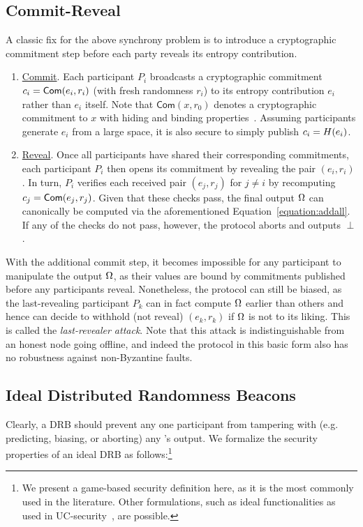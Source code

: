 \subsection{Commit-Reveal}
\label{subsection:commit-reveal}
A classic fix for the above synchrony problem is to introduce a cryptographic commitment step before each party reveals its entropy contribution.
\begin{enumerate}
\item \underline{Commit}. Each participant $P_i$ broadcasts a cryptographic commitment $c_i = \mathsf{Com}(e_i, r_i)$ (with fresh randomness $r_i$) to its entropy contribution $e_i$ rather than $e_i$ itself. Note that $\mathsf{Com}(x, r_0)$ denotes a cryptographic commitment to $x$ with hiding and binding properties~\cite{blum1983coin,damgaard1998commitment}. Assuming participants generate $e_i$ from a large space, it is also secure to simply publish $c_i = H(e_i)$.
\item \underline{Reveal}. Once all participants have shared their corresponding commitments, each participant $P_i$ then opens its commitment by revealing the pair $(e_i, r_i)$. In turn, $P_i$ verifies each received pair $(e_j, r_j)$ for $j \neq i$ by recomputing $c_j = \mathsf{Com}(e_j, r_j)$. Given that these checks pass, the final output $\Omega$ can canonically be computed via the aforementioned Equation~\ref{equation:addall}. If any of the checks do not pass, however, the protocol aborts and outputs $\perp$.
\end{enumerate}

With the additional commit step, it becomes impossible for any participant to manipulate the output $\Omega$, as their values are bound by commitments published before any participants reveal. Nonetheless, the protocol can still be biased, as the last-revealing participant $P_k$ can in fact compute $\Omega$ earlier than others and hence can decide to withhold (not reveal) $(e_k, r_k)$ if $\Omega$ is not to its liking. This is called the \textit{last-revealer attack}. Note that this attack is indistinguishable from an honest node going offline, and indeed the protocol in this basic form also has no robustness against non-Byzantine faults.

\subsection{Ideal Distributed Randomness Beacons}
Clearly, a DRB should prevent any one participant from tampering with (e.g. predicting, biasing, or aborting) any \epoch's output.
We formalize the security properties of an ideal DRB as follows:\footnote{We present a game-based security definition here, as it is the most commonly used in the literature. Other formulations, such as ideal functionalities as used in UC-security~\cite{canetti2001universally}, are possible.}

